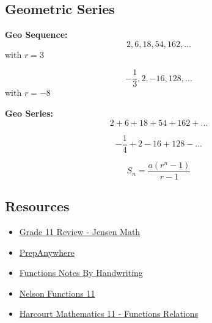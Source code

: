 \documentclass[12pt,a4paper]{article}
\begin{document}
\subsection{Geometric Series}
    \begin{minipage}[t]{0.45\linewidth}
        \textbf{Geo Sequence:} 
        \[2, 6, 18, 54, 162, \ldots\] with \(r=3\)

        \[-\frac{1}{3}, 2, -16, 128, \ldots\] with \(r=-8\)
    \end{minipage}%
    \begin{minipage}[t]{0.45\linewidth}
        \textbf{Geo Series:}
        \[2+6+18+54+162+\ldots\]

        \[-\frac{1}{4}+2-16+128-\ldots\]
    \end{minipage}
    \[S_n = \frac{a(r^n-1)}{r-1}\]
\newpage
\subsection*{Resources}
\begin{itemize}
    \item \href{https://www.jensenmath.ca/math11-review}{Grade 11 Review - Jensen Math}
    \item \href{https://app.prepanywhere.com/student/prep/textbooks/11-functions-harcourt}{PrepAnywhere}
    \item \href{https://drive.google.com/file/d/1VgZ77POyoMEczAEWLu3paCfhzBymzKUz/view}{Functions Notes By Handwriting}
    \item \href{https://drive.google.com/file/d/1PrHGeG7tlBSpfuxJ4Kyp4dBVaPc5-Y3Y/view?usp=sharing}{Nelson Functions 11}
    \item \href{https://drive.google.com/file/d/1vb2JS5SP_WwbW3_XYyNpr6dCnLb9Jhrr/view?usp=sharing}{Harcourt Mathematics 11 - Functions Relations}
\end{itemize}
\end{document}

